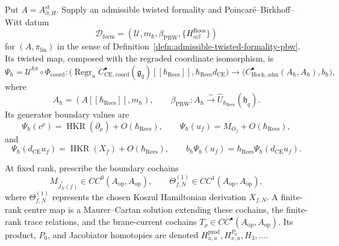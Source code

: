 \begin{defn}
\label{def:completion-centre-cochains}
Put \(A=A_{\partial,H}^{\mathrm{st}}\).  Supply an admissible twisted
formality and Poincar\'e--Birkhoff--Witt datum
\[
  \mathcal D_{\mathrm{form}}
  = (\mathcal U,m_\hbar,\beta_{\mathrm{PBW}},
     \{H^{\mathrm{Roos}}_{\alpha\beta}\})
\]
for \((A,\pi_{\mathrm{lin}})\) in the sense of
Definition~\ref{defn:admissible-twisted-formality-pbw}.  Its twisted
map, composed with the regraded coordinate isomorphism, is
\[
  \Psi_\hbar
  =
  \mathcal U^{\hbar\pi}\circ\Phi_{\mathrm{coord}}\colon
  \bigl(\operatorname{Regr}_u
    C^\bullet_{\mathrm{CE},\mathrm{coord}}(\mathfrak g_q)
    [[\hbar_{\mathrm{Rees}}]],
    \hbar_{\mathrm{Rees}}d_{\mathrm{CE}}\bigr)
  \longrightarrow
  \bigl(C^\bullet_{\mathrm{Hoch},\mathrm{adm}}
    (A_\hbar,A_\hbar),b_\hbar\bigr),
\]
where
\[
  A_\hbar=(A[[\hbar_{\mathrm{Rees}}]],m_\hbar),
  \qquad
  \beta_{\mathrm{PBW}}\colon A_\hbar
  \xrightarrow{\sim}
  \widehat U_{\hbar_{\mathrm{Rees}}}(\mathfrak h_q).
\]
Its generator boundary values are
\[
  \Psi_\hbar(c^\rho)
    =\operatorname{HKR}(\partial_\rho)
      +O(\hbar_{\mathrm{Rees}}),
  \qquad
  \Psi_\hbar(u_f)
    =M_{O_f}+O(\hbar_{\mathrm{Rees}}),
\]
and
\[
  \Psi_\hbar(d_{\mathrm{CE}}u_f)
    =\operatorname{HKR}(X_f)
      +O(\hbar_{\mathrm{Rees}}),
  \qquad
  b_\hbar\Psi_\hbar(u_f)
    =\hbar_{\mathrm{Rees}}
      \Psi_\hbar(d_{\mathrm{CE}}u_f).
\]

At fixed rank, prescribe the boundary cochains
\[
  M_{\widetilde J_N^s(f)}\in
  CC^0(A_{\mathrm{op}},A_{\mathrm{op}}),
  \qquad
  \Theta^{(1)}_{f,N}\in
  CC^1(A_{\mathrm{op}},A_{\mathrm{op}}),
\]
where \(\Theta^{(1)}_{f,N}\) represents the chosen Koszul
Hamiltonian derivation \(X_{f,N}\).  A finite-rank centre map is a
Maurer--Cartan solution extending these cochains, the finite-rank
trace relations, and the brane-current cochains
\(T_\rho\in CC^\bullet(A_{\mathrm{op}},A_{\mathrm{op}})\).
Its product, \(P_0\), and Jacobiator homotopies are denoted
\(H^{\mathrm{prod}}_{x,a},H^{P_0}_{x,a},H_3,\ldots\).
\end{defn}

